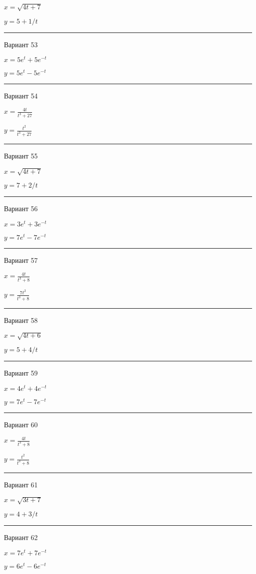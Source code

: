 \documentclass[11pt]{report}
\begin{document}
$x = \sqrt{4 t + 7}$

$y = 5 + 1 / t$

\rule{\textwidth}{.2mm}

 Вариант 53

$x = 5 e^{t} + 5 e^{- t}$

$y = 5 e^{t} - 5 e^{- t}$

\rule{\textwidth}{.2mm}

 Вариант 54

$x = \frac{4 t}{t^{3} + 27}$

$y = \frac{t^{2}}{t^{3} + 27}$

\rule{\textwidth}{.2mm}

 Вариант 55

$x = \sqrt{4 t + 7}$

$y = 7 + 2 / t$

\rule{\textwidth}{.2mm}

 Вариант 56

$x = 3 e^{t} + 3 e^{- t}$

$y = 7 e^{t} - 7 e^{- t}$

\rule{\textwidth}{.2mm}

 Вариант 57

$x = \frac{4 t}{t^{3} + 8}$

$y = \frac{7 t^{2}}{t^{3} + 8}$

\rule{\textwidth}{.2mm}

 Вариант 58

$x = \sqrt{4 t + 6}$

$y = 5 + 4 / t$

\rule{\textwidth}{.2mm}

 Вариант 59

$x = 4 e^{t} + 4 e^{- t}$

$y = 7 e^{t} - 7 e^{- t}$

\rule{\textwidth}{.2mm}

 Вариант 60

$x = \frac{4 t}{t^{3} + 8}$

$y = \frac{t^{2}}{t^{3} + 8}$

\rule{\textwidth}{.2mm}

 Вариант 61

$x = \sqrt{3 t + 7}$

$y = 4 + 3 / t$

\rule{\textwidth}{.2mm}

 Вариант 62

$x = 7 e^{t} + 7 e^{- t}$

$y = 6 e^{t} - 6 e^{- t}$
\end{document}
